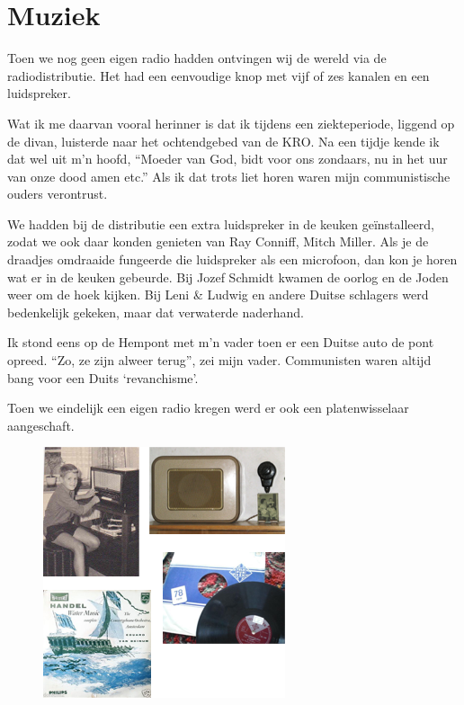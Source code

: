 \documentclass[12pt,twoside]{memoir}
\begin{document}
\chapter{Muziek} %
\label{cha:muziek}

Toen we nog geen eigen radio hadden ontvingen wij de wereld via de radiodistributie. Het had een eenvoudige knop met vijf of zes kanalen en een luidspreker. 

Wat ik me daarvan vooral herinner is dat ik tijdens een ziekteperiode, liggend op de divan, luisterde naar het ochtendgebed van de KRO. Na een tijdje kende ik dat wel uit m’n hoofd, ``Moeder van God, bidt voor ons zondaars, nu in het uur van onze dood amen etc.'' Als ik dat trots liet horen waren mijn communistische ouders verontrust. 

We hadden bij de distributie een extra luidspreker in de keuken geïnstalleerd, zodat we ook daar konden genieten van Ray Conniff, Mitch Miller. Als je de draadjes omdraaide fungeerde die luidspreker als een microfoon, dan kon je horen wat er in de keuken gebeurde. Bij Jozef Schmidt kwamen de oorlog en de Joden weer om de hoek kijken. Bij Leni \& Ludwig en andere Duitse schlagers werd bedenkelijk gekeken, maar dat verwaterde naderhand. 

Ik stond eens op de Hempont met m’n vader toen er een Duitse auto de pont opreed. ``Zo, ze zijn alweer terug'', zei mijn vader. Communisten waren altijd bang voor een Duits `revanchisme’.

Toen we eindelijk een eigen radio kregen werd er ook een platenwisselaar aangeschaft. 

\begin{figure}
\includegraphics[width=\textwidth]{img/ch16/muziek}
\end{figure}
\end{document}
